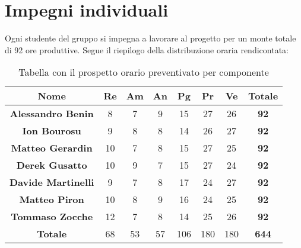 


\section{Impegni individuali}
Ogni studente del gruppo si impegna a lavorare al progetto per un monte totale di 92 ore
produttive. Segue il riepilogo della distribuzione oraria rendicontata:

\begin{table}[H]
    \centering
    \renewcommand{\arraystretch}{1.5}
    \begin{tabular}{|>{\bfseries}c|c|c|c|c|c|c|>{\bfseries}c|}
        \hline
        \rowcolor{gray!70} 
        \color{white}\textbf{Nome} & \color{white}\textbf{Re} & \color{white}\textbf{Am} & \color{white}\textbf{An} & \color{white}\textbf{Pg} & \color{white}\textbf{Pr} & \color{white}\textbf{Ve} & \color{white}\textbf{Totale} \\
        \hline
        \color{black}\textbf{Alessandro Benin} & 8 & 7 & 9 & 15 & 27 & 26 & 92 \\ 
        \hline
        \rowcolor{gray!10} %
        \color{black}\textbf{Ion Bourosu} & 9 & 8 & 8 & 14 & 26 & 27 & 92 \\ 
        \hline
        \color{black}\textbf{Matteo Gerardin} & 10 & 7 & 8 & 15 & 27 & 25 & 92 \\ 
        \hline
        \rowcolor{gray!10} %
        \color{black}\textbf{Derek Gusatto} & 10 & 9 & 7 & 15 & 27 & 24 & 92 \\ 
        \hline
         \color{black}\textbf{Davide Martinelli} & 9 & 7 & 8 & 17 & 24 & 27 & 92 \\ 
        \hline
        \rowcolor{gray!10} %
        \color{black}\textbf{Matteo Piron} & 10 & 8 & 9 & 16 & 24 & 25 & 92 \\ 
        \hline
        \color{black}\textbf{Tommaso Zocche} & 12 & 7 & 8 & 14 & 25 & 26 & 92 \\ 
        \hline
        \rowcolor{gray!70} 
        \color{white}\textbf{Totale} & \color{white}68 & \color{white}53 & \color{white}57 & \color{white}106 & \color{white}180 & \color{white}180 & \color{white}644 \\ 
        \hline
    \end{tabular}
    \caption{Tabella con il prospetto orario preventivato per componente}
\end{table}